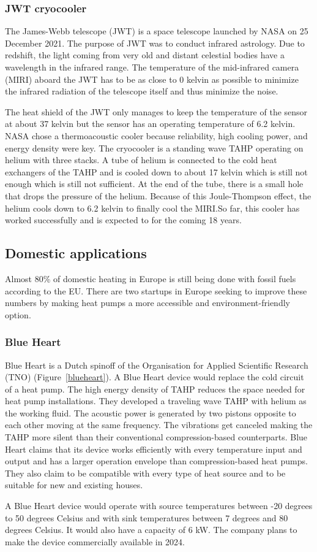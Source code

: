 \documentclass[a4paper]{article}
\newcommand{\newpara}
    {
      \bigbreak{}
      \noindent
    }
\begin{document}
\subsubsection{JWT cryocooler\cite{Petach2014MidII,Moore_2017,ross2022conceptual}}
The James-Webb telescope (JWT) is a space telescope launched by NASA on 25 December 2021. The purpose of JWT was to conduct infrared astrology. Due to redshift, the light coming from very old and distant celestial bodies have a wavelength in the infrared range. The temperature of the mid-infrared camera (MIRI) aboard the JWT has to be as close to 0 kelvin as possible to minimize the infrared radiation of the telescope itself and thus minimize the noise.
\newpara{}
The heat shield of the JWT only manages to keep the temperature of the sensor at about 37 kelvin but the sensor has an operating temperature of 6.2 kelvin. NASA chose a thermoacoustic cooler because reliability, high cooling power, and energy density were key. The cryocooler is a standing wave TAHP operating on helium with three stacks. A tube of helium is connected to the cold heat exchangers of the TAHP and is cooled down to about 17 kelvin which is still not enough which is still not sufficient. At the end of the tube, there is a small hole that drops the pressure of the helium. Because of this Joule-Thompson effect, the helium cools down to 6.2 kelvin to finally cool the MIRI.\@ So far, this cooler has worked successfully and is expected to for the coming 18 years.

\subsection{Domestic applications}
Almost 80\% of domestic heating in Europe is still being done with fossil fuels according to the EU\cite{EU}. There are two startups in Europe seeking to improve these numbers by making heat pumps a more accessible and environment-friendly option.
\subsubsection{Blue Heart\cite{blueheart}}
Blue Heart is a Dutch spinoff of the Organisation for Applied Scientific Research (TNO) (Figure~\ref{blueheart}). A Blue Heart device would replace the cold circuit of a heat pump. The high energy density of TAHP reduces the space needed for heat pump installations. They developed a traveling wave TAHP with helium as the working fluid. The acoustic power is generated by two pistons opposite to each other moving at the same frequency. The vibrations get canceled making the TAHP more silent than their conventional compression-based counterparts. Blue Heart claims that its device works efficiently with every temperature input and output and has a larger operation envelope than compression-based heat pumps. They also claim to be compatible with every type of heat source and to be suitable for new and existing houses.
\newpara{}
A Blue Heart device would operate with source temperatures between -20 degrees to 50 degrees Celsius and with sink temperatures between 7 degrees and 80 degrees Celsius. It would also have a capacity of 6 kW. The company plans to make the device commercially available in 2024.
\end{document}
